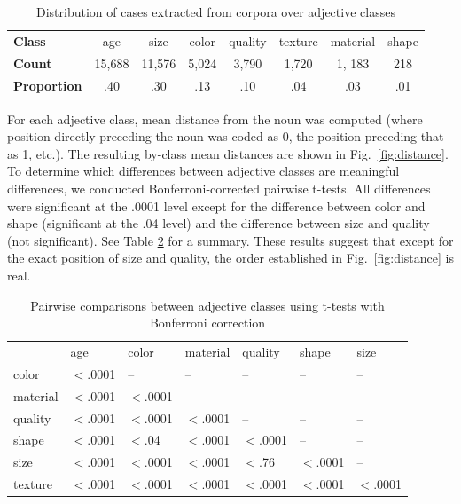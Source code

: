 \documentclass{pnastwo}
\newcommand{\tableref}[1]{Table \ref{#1}}
\newcommand{\figref}[1]{Fig.~\ref{#1}}
\begin{document}
\begin{article}
\begin{materials}
\begin{table}
	\caption{Distribution of cases extracted from corpora over adjective classes}
	\begin{tabular}{l c c c c c c c}
	\textbf{Class} & age & size & color & quality & texture & material & shape \\
	\textbf{Count} & 15,688 & 11,576 & 5,024 & 3,790 & 1,720 & 1, 183 & 218 \\
	\textbf{Proportion} & .40 & .30 & .13 & .10 & .04 & .03 & .01
	\end{tabular}

		\label{tab:adjdist}
\end{table}

For each adjective class, mean distance from the noun was computed (where position directly preceding the noun was coded as 0, the position preceding that as 1, etc.). The resulting by-class mean distances are shown in \figref{fig:distance}. To determine which differences between adjective classes are meaningful differences, we conducted Bonferroni-corrected pairwise t-tests. All differences were significant at the .0001 level except for the difference between color and shape (significant at the .04 level) and the difference between size and quality (not significant). See \tableref{tab:bonferronicorpus} for a summary. These results suggest that except for the exact position of size and quality, the order established in \figref{fig:distance} is real.

\begin{table}
\caption{Pairwise comparisons between adjective classes using t-tests with Bonferroni correction}

\begin{tabular}{l l l l l l l}
       &  age & color & material & quality & shape & size\\
color &     $<$.0001 &    --   &    --   &   -- &   --  & --\\
material &  $<$.0001 &  $<$.0001 &      --  &    -- &   -- &  --\\
quality &   $<$.0001 & $<$.0001 &         $<$.0001 &      --  &  -- &  --\\
shape &     $<$.0001 & $<$.04 &        $<$.0001 &  $<$.0001 &    -- &  --\\
size &      $<$.0001 & $<$.0001 &        $<$.0001 &  $<$.76 &    $<$.0001 &   --\\
texture &   $<$.0001 & $<$.0001 &       $<$.0001 &  $<$.0001 &    $<$.0001 &    $<$.0001
\end{tabular}
\label{tab:bonferronicorpus}
\end{table}


\end{materials}
\end{article}
\end{document}
